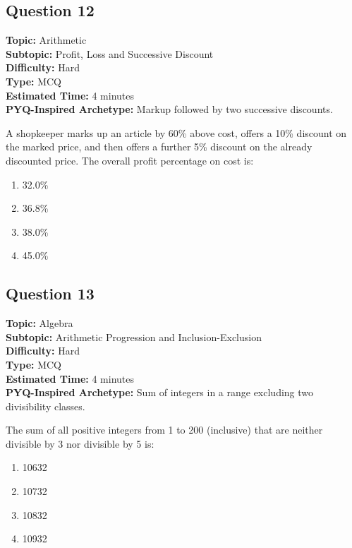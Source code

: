 \documentclass[11pt]{article}
\begin{document}
\subsection*{Question 12}
\textbf{Topic:} Arithmetic \\
\textbf{Subtopic:} Profit, Loss and Successive Discount \\
\textbf{Difficulty:} Hard \\
\textbf{Type:} MCQ \\
\textbf{Estimated Time:} 4 minutes \\
\textbf{PYQ-Inspired Archetype:} Markup followed by two successive discounts.

\begin{tcolorbox}
A shopkeeper marks up an article by 60\% above cost, offers a 10\% discount on the marked price, and then offers a further 5\% discount on the already discounted price. The overall profit percentage on cost is:
\end{tcolorbox}
\begin{enumerate}[label=(\Alph*)]
\item 32.0\%
\item 36.8\%
\item 38.0\%
\item 45.0\%
\end{enumerate}

\subsection*{Question 13}
\textbf{Topic:} Algebra \\
\textbf{Subtopic:} Arithmetic Progression and Inclusion-Exclusion \\
\textbf{Difficulty:} Hard \\
\textbf{Type:} MCQ \\
\textbf{Estimated Time:} 4 minutes \\
\textbf{PYQ-Inspired Archetype:} Sum of integers in a range excluding two divisibility classes.

\begin{tcolorbox}
The sum of all positive integers from 1 to 200 (inclusive) that are neither divisible by 3 nor divisible by 5 is:
\end{tcolorbox}
\begin{enumerate}[label=(\Alph*)]
\item 10632
\item 10732
\item 10832
\item 10932
\end{enumerate}
\end{document}
